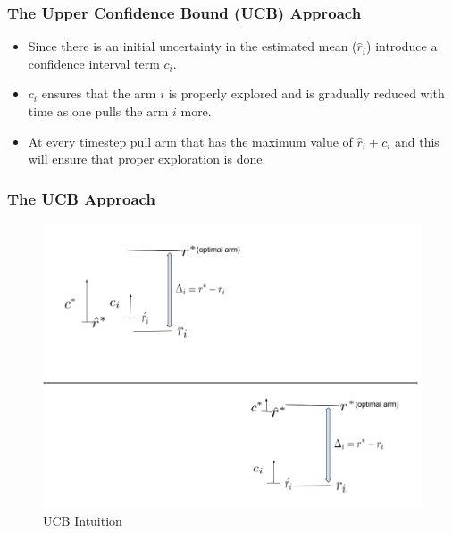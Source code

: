 

\begin{frame}
\frametitle{The Upper Confidence Bound (UCB) Approach}
\begin{itemize}
\item<1-> Since there is an initial uncertainty in the estimated mean ($\hat{r}_i$) introduce a confidence interval term $c_i$.
\item<2-> $c_i$ ensures that the arm $i$ is properly explored and is gradually reduced with time as one pulls the arm $i$ more.
\item<3-> At every timestep pull arm that has the maximum value of $\hat{r}_i + c_i$ and this will ensure that proper exploration is done. 
\end{itemize}
\end{frame}

\begin{frame}
\frametitle{The UCB Approach}
\begin{figure}
\caption{UCB Intuition}
\includegraphics[scale=0.278]{img/UCB_Drawing.png}
\end{figure}
\end{frame}


